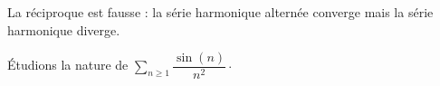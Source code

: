 \documentclass[french,11pt,twoside]{VcCours}
\newcommand{\Sum}[2]{\ensuremath{\textstyle{\sum\limits_{#1}^{#2}}}}
\begin{document}
\begin{Demonstration}{} 
%
%
%
\newpage

\vspace*{5cm}

\end{Demonstration}

\begin{Remarque}{} La réciproque est fausse : la série harmonique alternée converge mais la série harmonique diverge.
\end{Remarque}

\begin{Exemple} Étudions la nature de $\Sum{n \geq 1}{} \dfrac{\sin(n)}{n^2} \cdot$

\vspace{3cm}
%
\end{Exemple}
\end{document}
